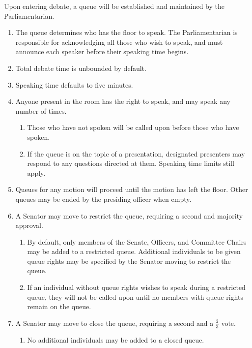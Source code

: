
\begin{enumerate}

{\bf \item Upon entering debate, a queue will be established and maintained by the Parliamentarian.
\begin{enumerate}
    \item The queue determines who has the floor to speak. The Parliamentarian is responsible for acknowledging all those who wish to speak, and must announce each speaker before their speaking time begins.

    \item Total debate time is unbounded by default.

    \item Speaking time defaults to five minutes.

    \item Anyone present in the room has the right to speak, and may speak any number of times.
    \begin{enumerate}
        \item Those who have not spoken will be called upon before those who have spoken.
        \item If the queue is on the topic of a presentation, designated presenters may respond to any questions directed at them. Speaking time limits still apply.
    \end{enumerate}

    \item Queues for any motion will proceed until the motion has left the floor. Other queues may be ended by the presiding officer when empty.

    \item A Senator may move to restrict the queue, requiring a second and majority approval.
    \begin{enumerate}
        \item By default, only members of the Senate, Officers, and Committee Chairs may be added to a restricted queue. Additional individuals to be given queue rights may be specified by the Senator moving to restrict the queue.
        \item If an individual without queue rights wishes to speak during a restricted queue, they will not be called upon until no members with queue rights remain on the queue.
    \end{enumerate}

    \item A Senator may move to close the queue, requiring a second and a $\frac{2}{3}$ vote.
    \begin{enumerate}
        \item No additional individuals may be added to a closed queue.
    \end{enumerate}


\end{enumerate}}
\end{enumerate}
